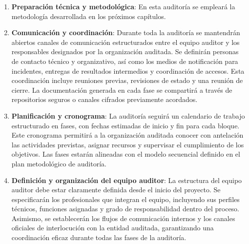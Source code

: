 \documentclass[a4paper, 11pt]{article}
\begin{document}
\begin{enumerate}
\item \textbf{Preparación técnica y metodológica}: En esta auditoría se empleará la metodología desarrollada en los próximos capítulos.

\item \textbf{Comunicación y coordinación}: Durante toda la auditoría se mantendrán abiertos canales de comunicación estructurados entre el equipo auditor y los responsables designados por la organización auditada. Se definirán personas de contacto técnico y organizativo, así como los medios de notificación para incidentes, entregas de resultados intermedios y coordinación de accesos. Esta coordinación incluye reuniones previas, revisiones de estado y una reunión de cierre. La documentación generada en cada fase se compartirá a través de repositorios seguros o canales cifrados previamente acordados.

\item \textbf{Planificación y cronograma}: La auditoría seguirá un calendario de trabajo estructurado en fases, con fechas estimadas de inicio y fin para cada bloque. Este cronograma permitirá a la organización auditada conocer con antelación las actividades previstas, asignar recursos y supervisar el cumplimiento de los objetivos. Las fases estarán alineadas con el modelo secuencial definido en el plan metodológico de auditoría.

\item \textbf{Definición y organización del equipo auditor}: La estructura del equipo auditor debe estar claramente definida desde el inicio del proyecto. Se especificarán los profesionales que integran el equipo, incluyendo sus perfiles técnicos, funciones asignadas y grado de responsabilidad dentro del proceso. Asimismo, se establecerán los flujos de comunicación internos y los canales oficiales de interlocución con la entidad auditada, garantizando una coordinación eficaz durante todas las fases de la auditoría.
\end{enumerate}
\end{document}
